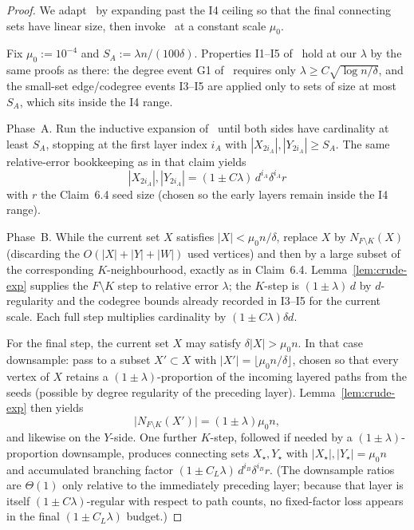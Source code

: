 \documentclass[11pt]{article}
\begin{document}
\begin{proof}
We adapt~\cite[Claim~6.4]{BIM25} by expanding past the I4 ceiling so that the
final connecting sets have linear size, then invoke~\cite[Lemma~6.15]{BIM25} at
a constant scale \(\mu_0\).

Fix \(\mu_0:=10^{-4}\) and \(S_A:=\lambda n/(100\delta)\).
Properties I1--I5 of~\cite[§6]{BIM25} hold at our \(\lambda\) by the same proofs
as there: the degree event G1 of~\cite[Lemma~5.3]{BIM25} requires only
\(\lambda\ge C\sqrt{\log n/\delta}\), and the small-set edge/codegree events I3--I5
are applied only to sets of size at most \(S_A\), which sits inside the I4 range.

Phase~A.
Run the inductive expansion of~\cite[Claim~6.4]{BIM25} until both sides have
cardinality at least \(S_A\), stopping at the first layer index \(i_A\) with
\(|X_{2i_A}|,|Y_{2i_A}|\ge S_A\).
The same relative-error bookkeeping as in that claim yields
\[
|X_{2i_A}|,|Y_{2i_A}|=(1\pm C\lambda)\,d^{i_A}\delta^{i_A}r
\]
with \(r\) the Claim~6.4 seed size (chosen so the early layers remain inside the
I4 range).

Phase~B.
While the current set \(X\) satisfies \(|X|<\mu_0 n/\delta\), replace \(X\) by
\(N_{F\setminus K}(X)\) (discarding the \(O(|X|+|Y|+|W|)\) used vertices) and then
by a large subset of the corresponding \(K\)-neighbourhood, exactly as in
Claim~6.4.
Lemma~\ref{lem:crude-exp} supplies the \(F\setminus K\) step to relative error
\(\lambda\); the \(K\)-step is \((1\pm\lambda)\,d\) by \(d\)-regularity and the codegree
bounds already recorded in I3--I5 for the current scale.
Each full step multiplies cardinality by \((1\pm C\lambda)\delta d\).

For the final step, the current set \(X\) may satisfy
\(\delta|X|>\mu_0 n\). In that case downsample: pass to a subset
\(X'\subset X\) with \(|X'|=\lfloor\mu_0 n/\delta\rfloor\), chosen so that every
vertex of \(X\) retains a \((1\pm\lambda)\)-proportion of the incoming layered paths
from the seeds (possible by degree regularity of the preceding layer).
Lemma~\ref{lem:crude-exp} then yields
\[
\bigl|N_{F\setminus K}(X')\bigr|=(1\pm\lambda)\mu_0 n,
\]
and likewise on the \(Y\)-side. One further \(K\)-step, followed if needed by a
\((1\pm\lambda)\)-proportion downsample, produces connecting sets
\(X_\star,Y_\star\) with \(|X_\star|,|Y_\star|=\mu_0 n\) and accumulated branching
factor \((1\pm C_L\lambda)\,d^{i_B}\delta^{i_B}r\).
(The downsample ratios are \(\Theta(1)\) only relative to the immediately
preceding layer; because that layer is itself \((1\pm C\lambda)\)-regular with
respect to path counts, no fixed-factor loss appears in the final
\((1\pm C_L\lambda)\) budget.)


\end{proof}
\end{document}
